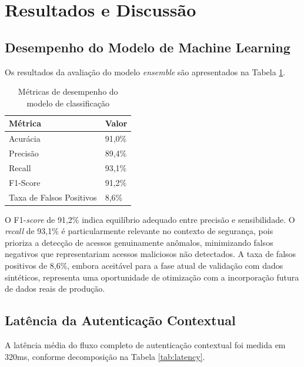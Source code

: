 \documentclass[12pt,a4paper]{article}
\begin{document}
\section{Resultados e Discussão}

\subsection{Desempenho do Modelo de Machine Learning}

Os resultados da avaliação do modelo \textit{ensemble} são apresentados na Tabela \ref{tab:ml_results}.

\begin{table}[H]
\centering
\caption{Métricas de desempenho do modelo de classificação}
\label{tab:ml_results}
\begin{tabular}{@{}ll@{}}
\toprule
\textbf{Métrica} & \textbf{Valor} \\
\midrule
Acurácia            & 91,0\% \\
Precisão            & 89,4\% \\
Recall              & 93,1\% \\
F1-Score            & 91,2\% \\
Taxa de Falsos Positivos & 8,6\% \\
\bottomrule
\end{tabular}
\end{table}

O F1-\textit{score} de 91,2\% indica equilíbrio adequado entre precisão e sensibilidade. O \textit{recall} de 93,1\% é particularmente relevante no contexto de segurança, pois prioriza a detecção de acessos genuinamente anômalos, minimizando falsos negativos que representariam acessos maliciosos não detectados. A taxa de falsos positivos de 8,6\%, embora aceitável para a fase atual de validação com dados sintéticos, representa uma oportunidade de otimização com a incorporação futura de dados reais de produção.

\subsection{Latência da Autenticação Contextual}

A latência média do fluxo completo de autenticação contextual foi medida em 320ms, conforme decomposição na Tabela \ref{tab:latency}.
\end{document}
